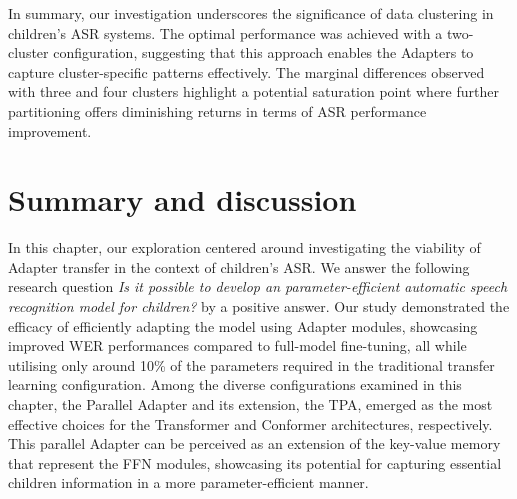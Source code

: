 In summary, our investigation underscores the significance of data clustering in children's ASR systems. The optimal performance was achieved with a two-cluster configuration, suggesting that this approach enables the Adapters to capture cluster-specific patterns effectively. The marginal differences observed with three and four clusters highlight a potential saturation point where further partitioning offers diminishing returns in terms of ASR performance improvement.


\section{Summary and discussion}
In this chapter, our exploration centered around investigating the viability of Adapter transfer in the context of children's ASR. We answer the following research question \textit{Is it possible to develop an parameter-efficient automatic speech recognition model for children?} by a positive answer. Our study demonstrated the efficacy of efficiently adapting the model using Adapter modules, showcasing improved WER performances compared to full-model fine-tuning, all while utilising only around 10\% of the parameters required in the traditional transfer learning configuration. Among the diverse configurations examined in this chapter, the Parallel Adapter and its extension, the TPA, emerged as the most effective choices for the Transformer and Conformer architectures, respectively. This parallel Adapter can be perceived as an extension of the key-value memory that represent the FFN modules, showcasing its potential for capturing essential children information in a more parameter-efficient manner.

